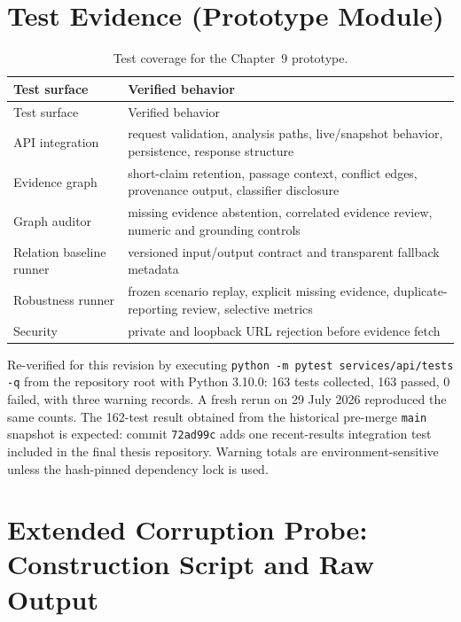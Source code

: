 \documentclass[12pt,a4paper,openany]{report}
\begin{document}
\chapter{Test Evidence (Prototype Module)}
\begin{longtable}{p{4cm}p{10cm}}
\caption{Test coverage for the Chapter~9 prototype.}\\
\toprule Test surface & Verified behavior \\
\midrule
\endfirsthead
\toprule Test surface & Verified behavior \\
\midrule
\endhead
API integration & request validation, analysis paths, live/snapshot behavior, persistence, response structure \\
Evidence graph & short-claim retention, passage context, conflict edges, provenance output, classifier disclosure \\
Graph auditor & missing evidence abstention, correlated evidence review, numeric and grounding controls \\
Relation baseline runner & versioned input/output contract and transparent fallback metadata \\
Robustness runner & frozen scenario replay, explicit missing evidence, duplicate-reporting review, selective metrics \\
Security & private and loopback URL rejection before evidence fetch \\
\bottomrule
\end{longtable}
Re-verified for this revision by executing \texttt{python -m pytest services/api/tests -q} from the repository root with Python 3.10.0: 163 tests collected, 163 passed, 0 failed, with three warning records. A fresh rerun on 29 July 2026 reproduced the same counts. The 162-test result obtained from the historical pre-merge \texttt{main} snapshot is expected: commit \texttt{72ad99c} adds one recent-results integration test included in the final thesis repository. Warning totals are environment-sensitive unless the hash-pinned dependency lock is used.

\chapter{Extended Corruption Probe: Construction Script and Raw Output}
\end{document}
